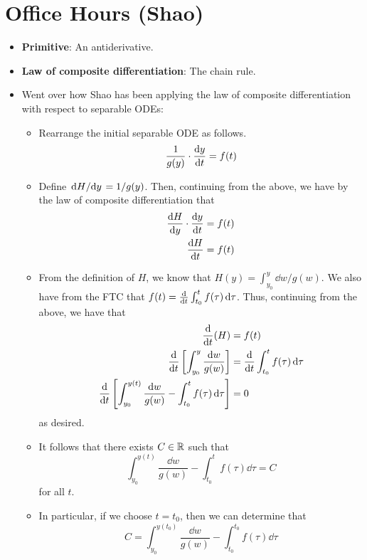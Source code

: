 \documentclass[../notes.tex]{subfiles}
\begin{document}
\section{Office Hours (Shao)}
\begin{itemize}
    \item \textbf{Primitive}: An antiderivative.
    \item \textbf{Law of composite differentiation}: The chain rule.
    \item Went over how Shao has been applying the law of composite differentiation with respect to separable ODEs:
    \begin{itemize}
        \item Rearrange the initial separable ODE as follows.
        \begin{equation*}
            \frac{1}{g(y)}\cdot\dv{y}{t} = f(t)
        \end{equation*}
        \item Define $\dv*{H}{y}=1/g(y)$. Then, continuing from the above, we have by the law of composite differentiation that
        \begin{align*}
            \dv{H}{y}\cdot\dv{y}{t} &= f(t)\\
            \dv{H}{t} &= f(t)
        \end{align*}
        \item From the definition of $H$, we know that $H(y)=\int_{y_0}^y\dd{w}/g(w)$. We also have from the FTC that $f(t)=\dv{t}\int_{t_0}^tf(\tau)\dd{\tau}$. Thus, continuing from the above, we have that
        \begin{align*}
            \dv{t}(H) &= f(t)\\
            \dv{t}\left[ \int_{y_0}^y\frac{\dd{w}}{g(w)} \right] &= \dv{t}\int_{t_0}^tf(\tau)\dd{\tau}\\
            \dv{t}\left[ \int_{y_0}^{y(t)}\frac{\dd{w}}{g(w)}-\int_{t_0}^tf(\tau)\dd{\tau} \right] &= 0
        \end{align*}
        as desired.
        \item It follows that there exists $C\in\mathbb{R}$ such that
        \begin{equation*}
            \int_{y_0}^{y(t)}\frac{\dd{w}}{g(w)}-\int_{t_0}^tf(\tau)\dd{\tau} = C
        \end{equation*}
        for all $t$.
        \item In particular, if we choose $t=t_0$, then we can determine that
        \begin{equation*}
            C = \int_{y_0}^{y(t_0)}\frac{\dd{w}}{g(w)}-\int_{t_0}^{t_0}f(\tau)\dd{\tau}

\end{equation*}
\end{itemize}
\end{itemize}
\end{document}
